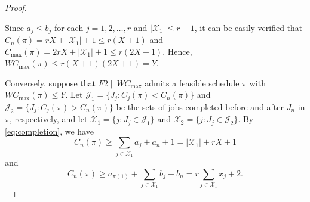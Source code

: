 ﻿\documentclass[12pt]{article}
\renewcommand{\thefigure}{\arabic{figure}}
\begin{document}
\begin{sloppypar}
\begin{proof}
\begin{figure}[H]
                \label{fig:nphard-partition}
            \end{figure}
            
            Since $a_j \leq b_j$ for each $j=1, 2, \ldots, r$ and $|\mathcal{X}_1| \leq r-1$, it can be easily verified that $C_n(\pi)=rX +|\mathcal{X}_1|+1 \leq r(X+1)$ and $C_{\max}(\pi)=2rX+|\mathcal{X}_1|+1 \leq r(2X+1)$. Hence, $W C_{\max}(\pi) \leq r(X+1)(2X+1)= Y$.
            
            Conversely, suppose that $F2 \parallel WC_{\max}$ admits a feasible schedule $\pi$ with $W C_{\max}(\pi) \leq Y$. Let $\mathcal{J}_1=\{J_j: C_j(\pi) <C_n(\pi)\}$ and $\mathcal{J}_2=\{J_j: C_j(\pi) > C_n(\pi)\}$ be the sets of jobs completed before and after $J_n$ in $\pi$, respectively, and let $\mathcal{X}_1=\{j: J_j \in \mathcal{J}_1\}$ and $\mathcal{X}_2=\{j: J_j \in \mathcal{J}_2\}$. By \cref{eq:completion}, we have
            \begin{equation}\label{eq:completetime1}
                C_n(\pi) \geq \sum_{j \in \mathcal{X}_1} a_j +a_n+ 1=|\mathcal{X}_1| +r X + 1
            \end{equation}
            and
            \begin{equation}\label{eq:completetime2}
                C_n(\pi) \geq a_{\pi(1)}+\sum_{j \in \mathcal{X}_1} b_j+b_n = r \sum_{j \in \mathcal{X}_1} x_j + 2.
            \end{equation}
            

\end{proof}
\end{sloppypar}
\end{document}
